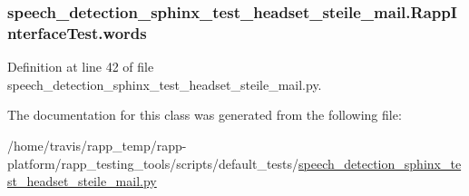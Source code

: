 \hypertarget{classspeech__detection__sphinx__test__headset__steile__mail_1_1RappInterfaceTest_a4a16408fdb79c0dfaa0d31b791439b20}{
\subsubsection[{words}]{\setlength{\rightskip}{0pt plus 5cm}speech\-\_\-detection\-\_\-sphinx\-\_\-test\-\_\-headset\-\_\-steile\-\_\-mail.\-Rapp\-Interface\-Test.\-words}}\label{classspeech__detection__sphinx__test__headset__steile__mail_1_1RappInterfaceTest_a4a16408fdb79c0dfaa0d31b791439b20}


Definition at line 42 of file speech\-\_\-detection\-\_\-sphinx\-\_\-test\-\_\-headset\-\_\-steile\-\_\-mail.\-py.



The documentation for this class was generated from the following file\-:\begin{DoxyCompactItemize}
\item 
/home/travis/rapp\-\_\-temp/rapp-\/platform/rapp\-\_\-testing\-\_\-tools/scripts/default\-\_\-tests/\hyperlink{speech__detection__sphinx__test__headset__steile__mail_8py}{speech\-\_\-detection\-\_\-sphinx\-\_\-test\-\_\-headset\-\_\-steile\-\_\-mail.\-py}\end{DoxyCompactItemize}

